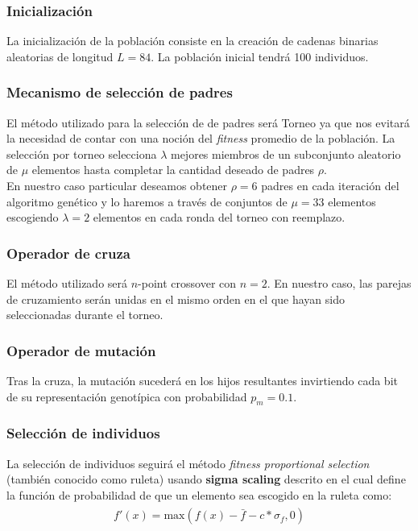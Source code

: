 \documentclass[10pt,letterpaper]{article}
\begin{document}
\subsubsection{Inicialización}

La inicialización de la población consiste en la creación de cadenas binarias
aleatorias de longitud $L=84$. La población inicial tendrá 100 individuos.

\subsubsection{Mecanismo de selección de padres}

El método utilizado para la selección de de padres será Torneo ya que nos evitará
la necesidad de contar con una noción del \textit{fitness} promedio de la población.
La selección por torneo selecciona $\lambda$ mejores miembros de un subconjunto 
aleatorio de $\mu$ elementos hasta completar la cantidad deseado de padres $\rho$. \\

En nuestro caso particular deseamos obtener $\rho=6$ padres en cada iteración del
algoritmo genético y lo haremos a través de conjuntos de $\mu=33$ elementos escogiendo
$\lambda=2$ elementos en cada ronda del torneo con reemplazo.

\subsubsection{Operador de cruza}

El método utilizado será $n$-point crossover con $n=2$. En nuestro caso, las parejas
de cruzamiento serán unidas en el mismo orden en el que hayan sido seleccionadas durante
el torneo.

\subsubsection{Operador de mutación}

Tras la cruza, la mutación sucederá en los hijos resultantes invirtiendo cada bit
de su representación genotípica con probabilidad $p_m=0.1$.

\subsubsection{Selección de individuos}

La selección de individuos seguirá el método \textit{fitness proportional selection}
(también conocido como ruleta) usando \textbf{sigma scaling} descrito en \cite{iec}
el cual define la función de probabilidad de que un elemento sea escogido en la
ruleta como:
    \begin{equation*} \begin{split} \begin{gathered}
        f'(x) = \mathrm{max}(f(x) - \bar{f} - c*\sigma_f, 0 )
    \end{gathered} \end{split} \end{equation*}
\end{document}
